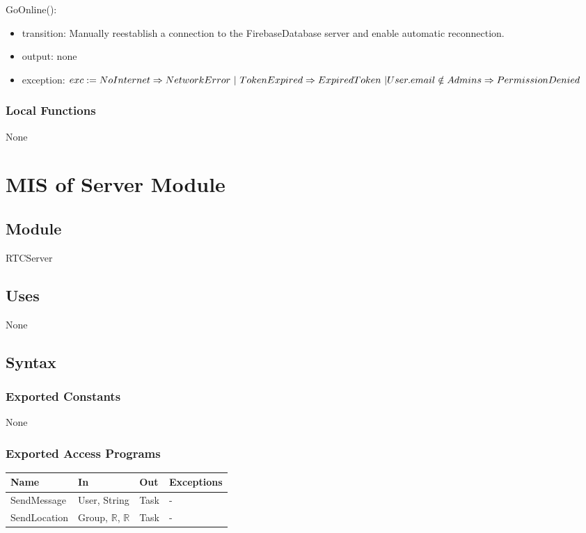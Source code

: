 \documentclass[12pt, titlepage]{article}
\begin{document}
\noindent GoOnline():
\begin{itemize}
\item transition: Manually reestablish a connection to the FirebaseDatabase server and enable automatic reconnection.
\item output: none
\item exception: $exc := NoInternet \Rightarrow NetworkError\ | \ TokenExpired \Rightarrow ExpiredToken\ | \\ User.email \notin Admins \Rightarrow PermissionDenied$
\end{itemize}

\subsubsection{Local Functions}

None

\newpage

\section{MIS of Server Module} \label{mServer}

\subsection{Module}

RTCServer

\subsection{Uses}

None

\subsection{Syntax}

\subsubsection{Exported Constants}

None

\subsubsection{Exported Access Programs}

\begin{center}
\begin{tabular}{p{2cm} p{4cm} p{4cm} p{2cm}}
\hline
\textbf{Name} & \textbf{In} & \textbf{Out} & \textbf{Exceptions} \\
\hline
SendMessage & User, String & Task & - \\
SendLocation & Group, $\mathbb{R}$, $\mathbb{R}$ & Task & - \\

\hline
\end{tabular}
\end{center}
\end{document}
